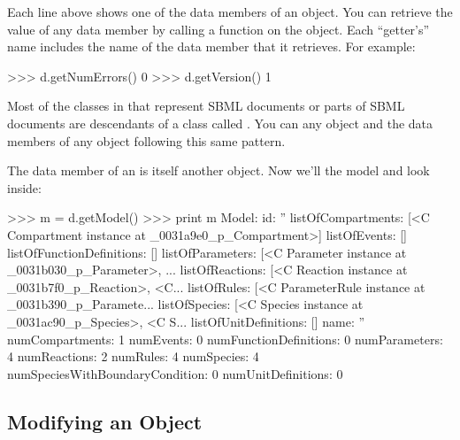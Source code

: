 \documentclass{sbmlmanual}
\begin{document}
Each line above shows one of the data members of an
 object.  You can retrieve the value of any data
member by calling a  function on the object.  Each
``getter's'' name includes the name of the data member that it
retrieves.  For example:

\begin{shellVerbatim}
>>> d.getNumErrors()
0
>>> d.getVersion()
1
\end{shellVerbatim}

Most of the classes in \libsbml{} that represent SBML documents or parts of
SBML documents are descendants of a class called .  You can
 any  object and  the data members of any
 object following this same pattern.

The  data member of an  is itself another
\libsbml{} object.  Now we'll  the model and look inside:

\begin{shellVerbatim}
>>> m = d.getModel()
>>> print m
Model:
   id:                               ''
   listOfCompartments:               [<C Compartment instance at _0031a9e0_p_Compartment>]
   listOfEvents:                     []
   listOfFunctionDefinitions:        []
   listOfParameters:                 [<C Parameter instance at _0031b030_p_Parameter>, ...
   listOfReactions:                  [<C Reaction instance at _0031b7f0_p_Reaction>, <C...
   listOfRules:                      [<C ParameterRule instance at _0031b390_p_Paramete...
   listOfSpecies:                    [<C Species instance at _0031ac90_p_Species>, <C S...
   listOfUnitDefinitions:            []
   name:                             ''
   numCompartments:                  1
   numEvents:                        0
   numFunctionDefinitions:           0
   numParameters:                    4
   numReactions:                     2
   numRules:                         4
   numSpecies:                       4
   numSpeciesWithBoundaryCondition:  0
   numUnitDefinitions:               0
\end{shellVerbatim}


\subsection{Modifying an  Object}
\label{sec:python-interactive}
\end{document}
